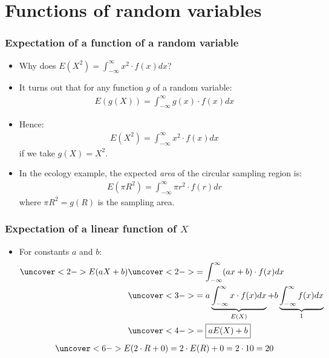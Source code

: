 \documentclass[handout]{beamer}\usepackage{graphicx, color}
\numberwithin{equation}{section}
\begin{document}
\section{Functions of random variables}

\begin{frame}
\frametitle{Expectation of a function of a random variable}
\begin{itemize}
\item Why does $E(X^2) = \int_{-\infty}^\infty x^2 \cdot f(x) dx$? 
\pause \item It turns out that for any function $g$ of a random variable:
\pause \begin{align*}
E(g(X)) = \int_{-\infty}^\infty g(x) \cdot f(x) dx\end{align*}
\pause \item Hence: \begin{align*}
E(X^2) = \int_{-\infty}^\infty x^2 \cdot f(x) dx
\end{align*}
if we take $g(X) = X^2$.
\pause \item In the ecology example, the expected \emph{area} of the circular sampling region is:
\pause \begin{align*}
E(\pi R^2) = \int_{-\infty}^\infty \pi r^2 \cdot f(r) dr
\end{align*}
where $\pi R^2 = g(R)$ is the sampling area.
\end{itemize}
\end{frame}

\begin{frame}
\frametitle{Expectation of a linear function of $X$} \small
\begin{itemize}
\item For constants $a$ and $b$:
\pause \begin{align*}
\uncover<2->{E(aX + b)} & \uncover<2->{= \int_{-\infty}^\infty (ax + b) \cdot f(x) dx} \\
&\uncover<3->{= a \underbrace{\int_{-\infty}^\infty x \cdot f(x) dx}_{E(X)} + b \underbrace{\int_{-\infty}^\infty f(x) dx }_{1} }\\
&\uncover<4->{= \fbox{$a E(X) + b$}}
\end{align*}
\begin{align*}
\uncover<6->{E(2\cdot R + 0) = 2 \cdot E(R) + 0 = 2 \cdot 10 = 20 }
\end{align*}
\end{itemize}
\end{frame}
\end{document}
